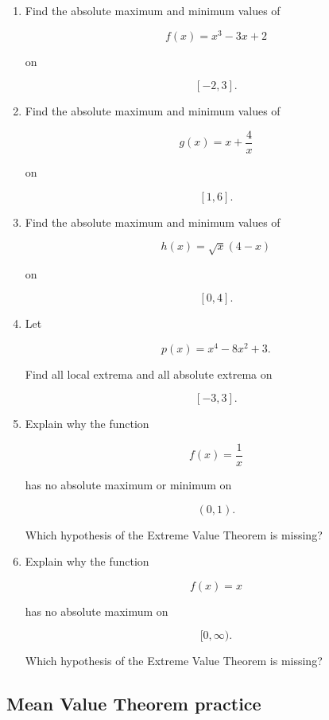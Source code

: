 \begin{enumerate}
\item Find the absolute maximum and minimum values of

\[
f(x)=x^3-3x+2
\]

on

\[
[-2,3].
\]

\item Find the absolute maximum and minimum values of

\[
g(x)=x+\frac4x
\]

on

\[
[1,6].
\]

\item Find the absolute maximum and minimum values of

\[
h(x)=\sqrt{x}(4-x)
\]

on

\[
[0,4].
\]

\item Let

\[
p(x)=x^4-8x^2+3.
\]

Find all local extrema and all absolute extrema on

\[
[-3,3].
\]

\item Explain why the function

\[
f(x)=\frac1x
\]

has no absolute maximum or minimum on

\[
(0,1).
\]

Which hypothesis of the Extreme Value Theorem is missing?

\item Explain why the function

\[
f(x)=x
\]

has no absolute maximum on

\[
[0,\infty).
\]

Which hypothesis of the Extreme Value Theorem is missing?
\end{enumerate}

\subsection{Mean Value Theorem practice}
\label{subsec:chapter-6-mvt-practice}

